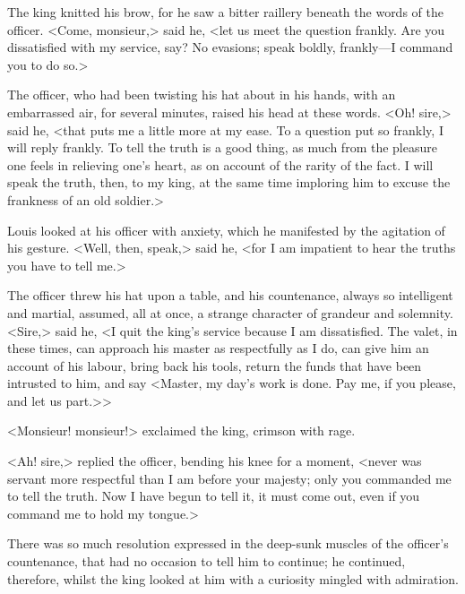 The king knitted his brow, for he saw a bitter raillery beneath the words of the officer. <Come, monsieur,> said he, <let us meet the question frankly. Are you dissatisfied with my service, say? No evasions; speak boldly, frankly—I command you to do so.>

The officer, who had been twisting his hat about in his hands, with an embarrassed air, for several minutes, raised his head at these words. <Oh! sire,> said he, <that puts me a little more at my ease. To a question put so frankly, I will reply frankly. To tell the truth is a good thing, as much from the pleasure one feels in relieving one's heart, as on account of the rarity of the fact. I will speak the truth, then, to my king, at the same time imploring him to excuse the frankness of an old soldier.>

Louis looked at his officer with anxiety, which he manifested by the agitation of his gesture. <Well, then, speak,> said he, <for I am impatient to hear the truths you have to tell me.>

The officer threw his hat upon a table, and his countenance, always so intelligent and martial, assumed, all at once, a strange character of grandeur and solemnity. <Sire,> said he, <I quit the king's service because I am dissatisfied. The valet, in these times, can approach his master as respectfully as I do, can give him an account of his labour, bring back his tools, return the funds that have been intrusted to him, and say <Master, my day's work is done. Pay me, if you please, and let us part.>>

<Monsieur! monsieur!> exclaimed the king, crimson with rage.

<Ah! sire,> replied the officer, bending his knee for a moment, <never was servant more respectful than I am before your majesty; only you commanded me to tell the truth. Now I have begun to tell it, it must come out, even if you command me to hold my tongue.>

There was so much resolution expressed in the deep-sunk muscles of the officer's countenance, that  had no occasion to tell him to continue; he continued, therefore, whilst the king looked at him with a curiosity mingled with admiration.

